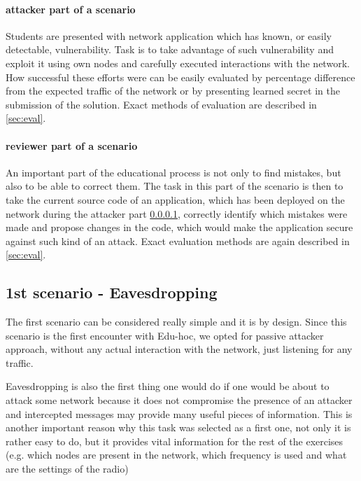 \documentclass[
  print, %
  table,   %
  nolof,     %
  nolot,     %
           oneside
]{fithesis3}
\begin{document}
  \paragraph{attacker part of a scenario}\label{par:att}
    Students are presented with network application which has known, or easily detectable, vulnerability. Task is to take advantage of such vulnerability and exploit it using own nodes and carefully executed interactions with the network. How successful these efforts were can be easily evaluated by percentage difference from the expected traffic of the network or by presenting learned secret in the submission of the solution. Exact methods of evaluation are described in \ref{sec:eval}.

  \paragraph{reviewer part of a scenario}
    An important part of the educational process is not only to find mistakes, but also to be able to correct them. The task in this part of the scenario is then to take the current source code of an application, which has been deployed on the network during the attacker part \ref{par:att}, correctly identify which mistakes were made and propose changes in the code, which would make the application secure against such kind of an attack. Exact evaluation methods are again described in \ref{sec:eval}.


    \subsection{1st scenario - Eavesdropping}\label{subsec:1st}
    The first scenario can be considered really simple and it is by design. Since this scenario is the first encounter with Edu-hoc, we opted for passive attacker approach, without any actual interaction with the network, just listening for any traffic.

    Eavesdropping is also the first thing one would do if one would be about to attack some network because it does not compromise the presence of an attacker and intercepted messages may provide many useful pieces of information. This is another important reason why this task was selected as a first one, not only it is rather easy to do, but it provides vital information for the rest of the exercises (e.g. which nodes are present in the network, which frequency is used and what are the settings of the radio)
\end{document}
